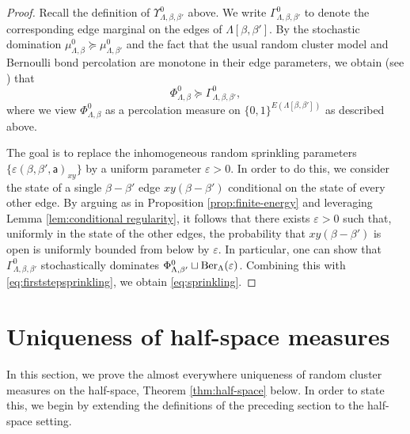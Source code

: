 \documentclass[11pt,a4paper]{article}
\numberwithin{equation}{section}
\theoremstyle{plain}
\theoremstyle{definition}
\begin{document}
\begin{proof}
Recall the definition of $\Upsilon^0_{\Lambda,\beta,\beta'}$ above. We write $\Gamma^0_{\Lambda,\beta,\beta'}$ to denote the corresponding edge marginal on the edges of $\Lambda[\beta,\beta']$. By the stochastic domination $\mu^0_{\Lambda,\beta} \succcurlyeq \mu^0_{\Lambda,\beta'}$ and the fact that the usual random cluster model and Bernoulli bond percolation are monotone in their edge parameters, we obtain (see \cite[Lemma 6.7]{gunaratnam2025supercritical}) that
\begin{equation}\label{eq:firststepsprinkling}
    \Phi^0_{\Lambda,\beta} \succcurlyeq \Gamma^0_{\Lambda,\beta,\beta'},
\end{equation}
where we view $\Phi^0_{\Lambda,\beta}$ as a percolation measure on $\{0,1\}^{E(\Lambda[\beta,\beta'])}$ as described above.

The goal is to replace the inhomogeneous random sprinkling parameters $\{ \varepsilon(\beta,\beta',\mathsf a)_{xy} \}$ by a uniform parameter $\varepsilon > 0$. In order to do this, we consider the state of a single $\beta-\beta'$ edge $xy(\beta-\beta')$ conditional on the state of every other edge. By arguing as in Proposition \ref{prop:finite-energy} and leveraging Lemma \ref{lem:conditional regularity}, it follows that there exists $\varepsilon > 0$ such that, uniformly in the state of the other edges, the probability that $xy(\beta-\beta')$ is open is uniformly bounded from below by $\varepsilon$. In particular, one can show that $\Gamma^0_{\Lambda,\beta,\beta'}$ stochastically dominates $\Phi^0_{\Lambda,\beta'} \sqcup \textup{Ber}_\Lambda(\varepsilon)$. Combining this with \eqref{eq:firststepsprinkling}, we obtain \eqref{eq:sprinkling}. 
\end{proof}

\section{Uniqueness of half-space measures}\label{sec:Gibbs_FK}

In this section, we prove the almost everywhere uniqueness of random cluster measures on the half-space, Theorem \ref{thm:half-space} below. In order to state this, we begin by extending the definitions of the preceding section to the half-space setting. 

\medskip
\end{document}

